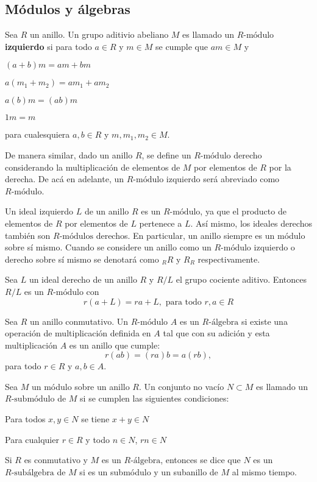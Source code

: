 \subsection{Módulos y álgebras}
\begin{definicion}
Sea $R$ un anillo. Un grupo aditivio abeliano $M$ es llamado un \textbf{$R\mbox{-módulo}$ izquierdo}  si para todo $a \in R$ y $m \in M$ se cumple que $am \in M$ y 
\begin{bulletList}
\item $(a+b)m = am  + bm$
\item $a(m_1 + m_2) = am_1 + am_2$
\item $a(b)m = (ab)m$
\item $1m = m$ 
\end{bulletList}
para cualesquiera $a,b \in R$ y $m, m_1, m_2 \in M$.
\end{definicion}
De manera similar, dado un anillo $R$, se define un $R\mbox{-módulo}$ derecho considerando la multiplicación de elementos de $M$ por elementos de $R$ por la derecha. De acá en adelante, un $R\mbox{-módulo}$ izquierdo será abreviado como $R\mbox{-módulo}$. 
\begin{ejemplo}
Un ideal izquierdo $L$ de un anillo $R$ es un $R\mbox{-módulo}$, ya que el producto de elementos de $R$ por elementos de $L$ pertenece a $L$. Así mismo, los ideales derechos también son $R\mbox{-módulos}$ derechos.
En particular, un anillo siempre es un módulo sobre sí mismo. Cuando se considere un anillo como un $R\mbox{-módulo}$ izquierdo o derecho sobre sí mismo se denotará como $_{R}R$ y $R_R$ respectivamente.
\end{ejemplo}
\begin{ejemplo}
Sea $L$ un ideal derecho de un anillo $R$ y $R/L$ el grupo cociente aditivo. Entonces $R/L$ es un $R\mbox{-módulo}$ con \[  r(a+L) = ra +L, \mbox{ para todo } r, a \in R  \]
\end{ejemplo} 
\begin{definicion}
Sea $R$ un anillo conmutativo. Un $R\mbox{-módulo}$ $A$ es un \textbf{$R\mbox{-álgebra}$} si existe una operación de multiplicación definida en $A$ tal que con su adición y esta multiplicación $A$ es un anillo que cumple: \[ r(ab) = (ra)b = a(rb), \] para todo $r \in R$ y $a,b \in A$.
\end{definicion}
\begin{definicion}
Sea $M$ un módulo sobre un anillo $R$. Un conjunto no vacío $N \subset M$ es llamado un \textbf{$R\mbox{-submódulo}$} de $M$ si se cumplen las siguientes condiciones:
\begin{bulletList}
\item Para todos $x,y \in N$ se tiene $x + y \in N$
\item Para cualquier $r \in R$ y todo $n \in N$, $rn \in N$
\end{bulletList}
Si $R$ es conmutativo y $M$ es un $R\mbox{-álgebra}$, entonces  se dice que $N$ es un $R\mbox{-subálgebra}$ de $M$ si es un submódulo y un subanillo de $M$ al mismo tiempo. 
\end{definicion}
